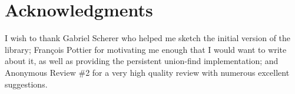 \documentclass{easychair}
\begin{document}
\section*{Acknowledgments}

I wish to thank Gabriel Scherer who helped me sketch the initial version of the
library; François Pottier for motivating me enough that I would want to write
about it, as well as providing the persistent union-find implementation; and
Anonymous Review \#2 for a very high quality review with numerous excellent
suggestions.



\end{document}

